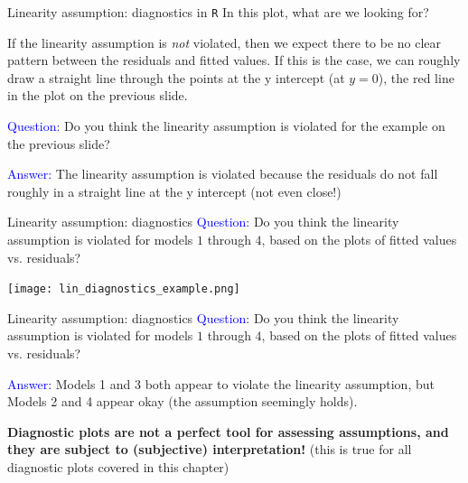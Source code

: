 \documentclass[10pt,t]{beamer}
\begin{document}
\begin{frame}{Linearity assumption: diagnostics in \texttt{R}}
In this plot, what are we looking for?

\vspace{0.3cm}

If the linearity assumption is \textit{not} violated, then we expect there to be no clear pattern between the residuals and fitted values. If this is the case, we can roughly draw a straight line through the points at the y intercept (at $y = 0$), the red line in the plot on the previous slide. 

\vspace{0.3cm}

\textcolor{blue}{Question:} Do you think the linearity assumption is violated for the example on the previous slide?\pause

\vspace{0.3cm}

\textcolor{blue}{Answer:} The linearity assumption is violated because the residuals do not fall roughly in a straight line at the y intercept (not even close!)

\end{frame}


\begin{frame}{Linearity assumption: diagnostics}
\textcolor{blue}{Question:} Do you think the linearity assumption is violated for models $1$ through $4$, based on the plots of fitted values vs. residuals?

\centering \texttt{[image: lin\_diagnostics\_example.png]}

\end{frame}

\begin{frame}{Linearity assumption: diagnostics}
\textcolor{blue}{Question:} Do you think the linearity assumption is violated for models $1$ through $4$, based on the plots of fitted values vs. residuals?

\vspace{0.3cm}

\textcolor{blue}{Answer:} Models 1 and 3 both appear to violate the linearity assumption, but Models 2 and 4 appear okay (the assumption seemingly holds). 

\vspace{0.3cm}

\textbf{Diagnostic plots are not a perfect tool for assessing assumptions, and they are subject to (subjective) interpretation!} (this is true for all diagnostic plots covered in this chapter)
\end{frame}
\end{document}
